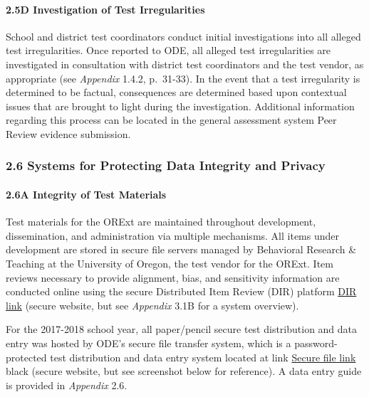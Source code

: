 \documentclass[]{article}
\let\oldparagraph\paragraph
\renewcommand{\paragraph}[1]{\oldparagraph{#1}\mbox{}}
\begin{document}
\paragraph{2.5D Investigation of Test
Irregularities}\label{d-investigation-of-test-irregularities}

School and district test coordinators conduct initial investigations
into all alleged test irregularities. Once reported to ODE, all alleged
test irregularities are investigated in consultation with district test
coordinators and the test vendor, as appropriate (see \emph{Appendix}
1.4.2, p.~31-33). In the event that a test irregularity is determined to
be factual, consequences are determined based upon contextual issues
that are brought to light during the investigation. Additional
information regarding this process can be located in the general
assessment system Peer Review evidence submission.

\subsubsection{2.6 Systems for Protecting Data Integrity and
Privacy}\label{systems-for-protecting-data-integrity-and-privacy}

\paragraph{2.6A Integrity of Test
Materials}\label{a-integrity-of-test-materials}

Test materials for the ORExt are maintained throughout development,
dissemination, and administration via multiple mechanisms. All items
under development are stored in secure file servers managed by
Behavioral Research \& Teaching at the University of Oregon, the test
vendor for the ORExt. Item reviews necessary to provide alignment, bias,
and sensitivity information are conducted online using the secure
Distributed Item Review (DIR) platform \color{link}
\href{http://brtitemreview.com}{DIR link} \color{black} (secure website,
but see \emph{Appendix} 3.1B for a system overview).

For the 2017-2018 school year, all paper/pencil secure test distribution
and data entry was hosted by ODE's secure file transfer system, which is
a password-protected test distribution and data entry system located at
\color
{link} \href{https://district.ode.state.or.us/apps/login/}{Secure file
link} \color
{black} (secure website, but see screenshot below for reference). A data
entry guide is provided in \emph{Appendix} 2.6.
\end{document}
